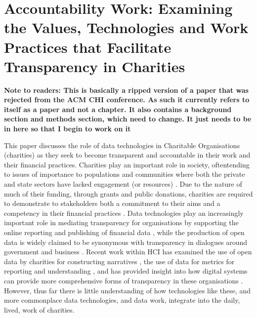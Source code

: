 \chapter{Accountability Work: Examining the Values, Technologies and Work Practices that Facilitate Transparency in Charities}
\label{sec:emp01}

\textbf{Note to readers: This is basically a ripped version of a paper that was rejected from the ACM CHI conference. As such it currently refers to itself as a paper and not a chapter. It also contains a background section and methods section, which need to change. It just needs to be in here so that I begin to work on it}

This paper discusses the role of data technologies in Charitable Organisations (charities) as they seek to become transparent and accountable in their work and their financial practices. Charities play an important role in society, oftentending to issues of importance to populations and communities where both the private and state sectors have lacked engagement (or resources) \cite{salamon_rise_1994}. Due to the nature of much of their funding, through grants and public donations, charities are required to demonstrate to stakeholders both a commitment to their aims and a competency in their financial practices \cite{macmillan_relationship_2005, oliver_what_2004}. Data technologies play an increasingly important role in mediating transparency for organisations by supporting the online reporting and publishing of financial data \cite{meijer_understanding_2009}, while the production of open data is widely claimed to be synonymous with transparency in dialogues around government and business \cite{coleman_lessons_2013, goldstein_open_2013, gordon_making_2013}. Recent work within HCI has examined the use of open data by charities for constructing narratives \cite{erete_storytelling_2016}, the use of data for metrics for reporting and understanding \cite{elsden_resviz:_2016}, and has provided insight into how digital systems can provide more comprehensive forms of transparency in these organisations \cite{marshall_accountable:_2016}. However, thus far there is little understanding of how technologies like these, and more commonplace data technologies, and data work, integrate into the daily, lived, work of charities.


